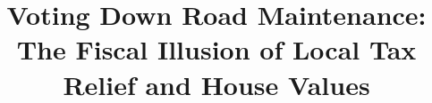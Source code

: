 \documentclass[12pt]{article}
\begin{document}
\hypersetup{pageanchor=false}
\pagestyle{empty}
\begin{titlepage}
\thispagestyle{empty}
\title{Voting Down Road Maintenance: The Fiscal Illusion of Local Tax Relief and House Values}
\maketitle
 


\end{titlepage}
\end{document}
